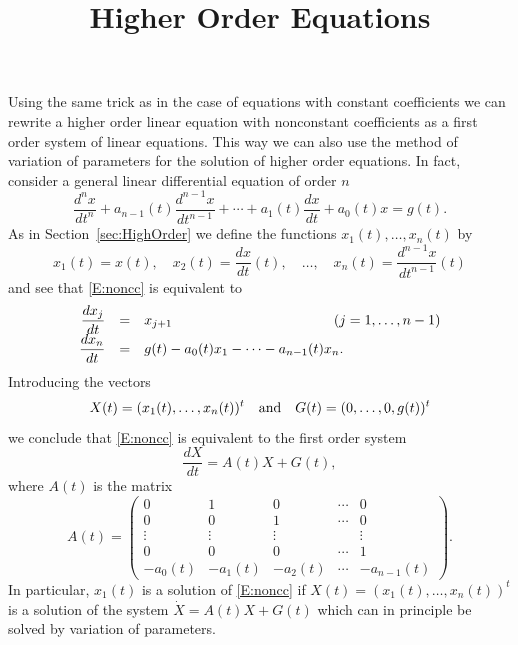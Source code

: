 \documentclass{ximera}
\title{Higher Order Equations}
\begin{document}
\begin{abstract}
\end{abstract}
\maketitle


\label{S:RO}

Using the same trick as in the case of equations with constant 
coefficients we can rewrite a higher order linear equation with
nonconstant coefficients as a first order system of linear
equations.  This way we can also use the method of variation 
of parameters for the solution of higher order equations.  
In fact, consider a general linear differential equation of 
order $n$
\begin{equation}
\label{E:noncc}
\frac{d^nx}{dt^n} + a_{n-1}(t)\frac{d^{n-1}x}{dt^{n-1}} +\cdots + 
a_1(t)\frac{dx}{dt}+a_0(t)x = g(t).
\end{equation}
As in Section~\ref{sec:HighOrder} we define the functions
$x_1(t),\ldots,x_n(t)$ by
\[
x_1(t)=x(t),\quad x_2(t)=\frac{dx}{dt}(t),\quad
\ldots, \quad  x_n(t)=\frac{d^{n-1}x}{dt^{n-1}}(t)
\]
and see that \eqref{E:noncc} is equivalent to
\arraystart
\[
\begin{array}{rcl}
\displaystyle \frac{dx_j}{dt}&=&x_{j+1} \hspace{1.6in} (j=1,\ldots,n-1)\\
\displaystyle \frac{dx_n}{dt}&=& g(t) - a_0(t)x_1 - \cdots - a_{n-1}(t) x_n.
\end{array}
\]
\arrayfinish
Introducing the vectors
\[
X(t) = (x_1(t),\ldots,x_n(t))^t  \quad\mbox{and}\quad
G(t) = (0,\ldots,0,g(t))^t
\]
we conclude that \eqref{E:noncc} is equivalent to the 
first order system
\[
\frac{dX}{dt} = A(t)X+G(t),
\]
where $A(t)$ is the matrix
\[
A(t) = \left(\begin{array}{ccccc}
0 & 1 & 0 & \cdots & 0\\
0 & 0 & 1 & \cdots & 0\\
\vdots & \vdots & \vdots & & \vdots\\
0 & 0 & 0 & \cdots & 1\\
-a_0(t) & -a_1(t) &  -a_2(t) & \cdots & -a_{n-1}(t)
\end{array}\right).
\]
In particular, $x_1(t)$ is a solution of \eqref{E:noncc} if 
$X(t)=(x_1(t),\ldots,x_n(t))^t$ is a solution of the system
$\dot X = A(t)X+G(t)$ which can in principle be solved by
variation of parameters.
\end{document}
